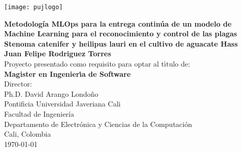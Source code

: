 \begin{center}
\thispagestyle{empty}
\vspace*{0cm}
\begin{center}
    \texttt{[image: pujlogo]}~\\[1.75cm]
\end{center}
\textbf{\fontsize{11}{12}\selectfont
Metodología MLOps para la entrega continúa de un modelo de Machine Learning para el reconocimiento y control de las plagas Stenoma catenifer y heilipus lauri en el cultivo de aguacate Hass}\\[1.75cm]
\normalsize\textbf{Juan Felipe Rodriguez Torres}\\[1.5cm]
\small Proyecto presentado como requisito para optar al
t\'{\i}tulo de:\\
\textbf{Magister en Ingenier\'{\i}a de Software}\\[1.5cm]
Director:\\
Ph.D. David Arango Londoño\\[1.6cm]

Pontificia Universidad Javeriana Cali\\
Facultad de Ingeniería\\
Departamento de Electrónica y Ciencias de la Computación\\
Cali, Colombia\\
\today\\
\end{center}
